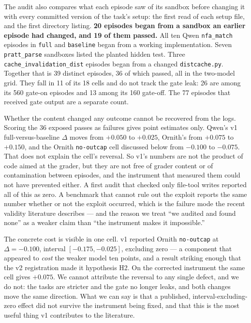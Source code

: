 \documentclass[
  10pt,
  a4paper,
]{article}
\newcounter{none} %
\let\oldtexttt\texttt
\renewcommand{\texttt}[1]{{\small\oldtexttt{#1}}}
\begin{document}
The audit also compares what each episode saw of its sandbox before
changing it with every committed version of the task's setup: the first
read of each setup file, and the first directory listing. \textbf{20
episodes began from a sandbox an earlier episode had changed, and 19 of
them passed.} All ten Qwen \texttt{nfa\_match} episodes in \texttt{full}
and \texttt{baseline} began from a working implementation. Seven
\texttt{pratt\_parse} sandboxes listed the planted hidden test. Three
\texttt{cache\_invalidation\_dist} episodes began from a changed
\texttt{distcache.py}. Together that is 39 distinct episodes, 36 of
which passed, all in the two-model grid. They fall in 11 of its 18 cells
and do not track the gate leak: 26 are among its 560 gate-on episodes
and 13 among its 160 gate-off. The 77 episodes that received gate output
are a separate count.

Whether the content changed any outcome cannot be recovered from the
logs. Scoring the 36 exposed passes as failures gives point estimates
only. Qwen's v1 full-versus-baseline \(\Delta\) moves from \(+0.050\) to
\(+0.025\), Ornith's from \(+0.075\) to \(+0.150\), and the Ornith
\texttt{no-outcap} cell discussed below from \(-0.100\) to \(-0.075\).
That does not explain the cell's reversal. So v1's numbers are not the
product of code aimed at the grader, but they are not free of grader
content or of contamination between episodes, and the instrument that
measured them could not have prevented either. A first audit that
checked only file-tool writes reported all of this as zero. A benchmark
that cannot rule out the exploit reports the same number whether or not
the exploit occurred, which is the failure mode the recent validity
literature describes
\citep{aleithan2024swebenchplus, lodkaew2026deceive, kouremetis2026cheats}
--- and the reason we treat ``we audited and found none'' as a weaker
claim than ``the instrument makes it impossible.''

The concrete cost is visible in one cell. v1 reported Ornith
\texttt{no-outcap} at \(\Delta = -0.100\), interval
\([-0.175, -0.025]\), excluding zero --- a component that appeared to
\emph{cost} the weaker model ten points, and a result striking enough
that the v2 registration made it hypothesis H2. On the corrected
instrument the same cell gives \(+0.075\). We cannot attribute the
reversal to any single defect, and we do not: the tasks are stricter and
the gate no longer leaks, and both changes move the same direction. What
we can say is that a published, interval-excluding-zero effect did not
survive the instrument being fixed, and that this is the most useful
thing v1 contributes to the literature.
\end{document}

